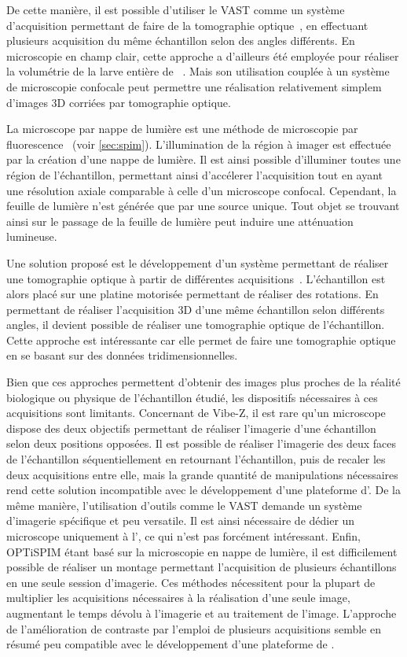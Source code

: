 \documentclass[\main/main.tex]{subfiles}
\begin{document}
%
De cette manière, il est possible d'utiliser le VAST comme un système d'acquisition permettant de faire de la tomographie optique~\cite{pardomartin_2013}, en effectuant plusieurs acquisition du même échantillon selon des angles différents.
%
En microscopie en champ clair,
cette approche a d'ailleurs été employée pour réaliser la volumétrie de la larve entière de \pz~\cite{guo_2017}.
%
Mais son utilisation couplée à un système de microscopie confocale peut permettre une réalisation relativement simplem d'images 3D corriées par tomographie optique.

%
La microscope par nappe de lumière est une méthode de microscopie par fluorescence~\cite{huisken_2004} (voir \autoref{sec:spim}).
%
L'illumination de la région à imager est effectuée par la création d'une nappe de lumière.
%
Il est ainsi possible d'illuminer toutes une région de l'échantillon, permettant ainsi d'accélerer l'acquisition tout en ayant une résolution axiale comparable à celle d'un microscope confocal.
%
Cependant, la feuille de lumière n'est générée que par une source unique.
%
Tout objet se trouvant ainsi sur le passage de la feuille de lumière peut induire une atténuation lumineuse.

%
Une solution proposé est le développement d'un système permettant de réaliser une tomographie optique à partir de différentes acquisitions~\cite{Mayer_2018}.
%
L'échantillon est alors placé sur une platine motorisée permettant de réaliser des rotations.
%
En permettant de réaliser l'acquisition 3D d'une même échantillon selon différents angles, il devient possible de réaliser une tomographie optique de l'échantillon.
%
Cette approche est intéressante car elle permet de faire une tomographie optique en se basant sur des données tridimensionnelles.

%
Bien que ces approches permettent d'obtenir des images plus proches de la réalité biologique ou physique de l'échantillon étudié, les dispositifs nécessaires à ces acquisitions sont limitants.
%
Concernant de Vibe-Z, il est rare qu'un microscope dispose des deux objectifs permettant de réaliser l'imagerie d'une échantillon selon deux positions opposées.
%
Il est possible de réaliser l'imagerie des deux faces de l'échantillon séquentiellement en retournant l'échantillon, puis de recaler les deux acquisitions entre elle, mais la grande quantité de manipulations nécessaires rend cette solution incompatible avec le développement d'une plateforme d'\hti{}.
%
De la même manière, l'utilisation d'outils comme le VAST demande un système d'imagerie spécifique et peu versatile. Il est ainsi nécessaire de dédier un microscope uniquement à l'\hti{}, ce qui n'est pas forcément intéressant.
%
Enfin, OPTiSPIM étant basé sur la microscopie en nappe de lumière, il est difficilement possible de réaliser un montage permettant l'acquisition de plusieurs échantillons en une seule session d'imagerie.
%
Ces méthodes nécessitent pour la plupart de multiplier les acquisitions nécessaires à la réalisation d'une seule image, augmentant le temps dévolu à l'imagerie et au traitement de l'image.
%
L'approche de l'amélioration de contraste par l'emploi de plusieurs acquisitions semble en résumé peu compatible avec le développement d'une plateforme de \hcs{}.
\end{document}
